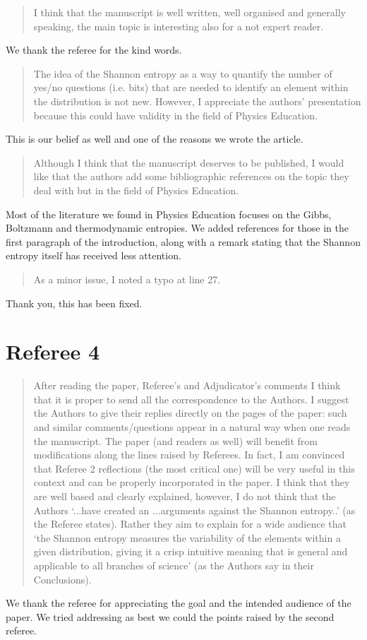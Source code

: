\documentclass[11pt]{article}
\begin{document}
\begin{quote}
	I think that the manuscript is well written, well organised and generally speaking, the main topic is interesting also for a not expert reader. 
\end{quote}

We thank the referee for the kind words.

\begin{quote}
The idea of the Shannon entropy as a way to quantify the number of yes/no questions (i.e. bits) that are needed to identify an element within the distribution is not new. However, I appreciate the authors' presentation because this could have validity in the field of Physics Education.
\end{quote}

This is our belief as well and one of the reasons we wrote the article.

\begin{quote}
Although I think that the manuscript deserves to be published, I would like that the authors add some bibliographic references on the topic they deal with but in the field of Physics Education.
\end{quote}

Most of the literature we found in Physics Education focuses on the Gibbs, Boltzmann and thermodynamic entropies. We added references for those in the first paragraph of the introduction, along with a remark stating that the Shannon entropy itself has received less attention.

\begin{quote}
As a minor issue, I noted a typo at line 27.
\end{quote}

Thank you, this has been fixed.

\section*{Referee 4}

\begin{quote}
After reading the paper, Referee’s and Adjudicator’s comments I think that it is proper to send all the correspondence to the Authors. I suggest the Authors to give their replies directly on the pages of the paper: such and similar comments/questions appear in a natural way when one reads the manuscript. The paper (and readers as well) will benefit from modifications along the lines raised by Referees. In fact, I am convinced that  Referee 2 reflections  (the most critical one) will be very useful in this context and can be properly incorporated in the paper. I think that they are well based and clearly explained, however, I do not think that the Authors ‘...have created an ...arguments against the Shannon entropy..’ (as the Referee states). Rather they aim to explain for a wide audience that ‘the Shannon entropy measures the variability of the elements within a given distribution, giving it a crisp intuitive meaning that is general and applicable to all branches of science’ (as the Authors say in their Conclusions).
\end{quote}

We thank the referee for appreciating the goal and the intended audience of the paper. We tried addressing as best we could the points raised by the second referee.
\end{document}
